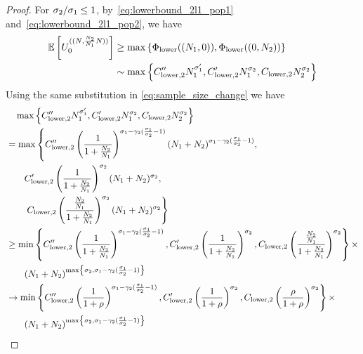 \begin{proof}
For $\sigma_{2}/\sigma_{1}\le 1$, by~\cref{eq:lowerbound_2l1_pop1} and~\cref{eq:lowerbound_2l1_pop2}, we have
\begin{align*}
    \E\left[\news{\bm{0}}{(\samplesize{},\frac{\samplesize{2}}{\samplesize{1}}\samplesize{})}\right]& \ge\max\left\{\lowerbound((\samplesize{1},0)),\lowerbound((0,\samplesize{2}))\right\} \\
    &\sim \max\left\{\constantlowerwithrateprime{2}\samplesize{1}^{\rate{1}'}, \constantlowerwithotherrate{2}\samplesize{1}^{\rate{2}}, \constantlower{2}\samplesize{2}^{\rate{2}}\right\} \\
\end{align*}
Using the same substitution in \cref{eq:sample_size_change} we have 
\begin{align*}
    &~~~\max\left\{C_{\mathrm{lower},2}''N_{1}^{\sigma_{1}'}, C_{\mathrm{lower},2}'N_{1}^{\sigma_{2}}, C_{\mathrm{lower},2}N_{2}^{\sigma_{2}}\right\}\\
    &=\max\left\{C_{\mathrm{lower},2}''\left(\frac{1}{1+\frac{N_{2}}{N_{1}}}\right)^{\sigma_{1}-\gamma_{2}(\frac{\sigma_{1}}{\sigma_{2}}-1)}(N_{1}+N_{2})^{\sigma_{1}-\gamma_{2}(\frac{\sigma_{1}}{\sigma_{2}}-1)}, \right.\\
    &~~~~~~C_{\mathrm{lower},2}'\left(\frac{1}{1+\frac{N_{2}}{N_{1}}}\right)^{\sigma_{2}}(N_{1}+N_{2})^{\sigma_{2}}, \\
    &~~~~~~\left.C_{\mathrm{lower},2}\left(\frac{\frac{N_{2}}{N_{1}}}{1+\frac{N_{2}}{N_{1}}}\right)^{\sigma_{2}}(N_{1}+N_{2})^{\sigma_{2}} \right\} \\
    &\ge \min\left\{C_{\mathrm{lower},2}''\left(\frac{1}{1+\frac{N_{2}}{N_{1}}}\right)^{\sigma_{1}-\gamma_{2}(\frac{\sigma_{1}}{\sigma_{2}}-1)},C_{\mathrm{lower},2}'\left(\frac{1}{1+\frac{N_{2}}{N_{1}}}\right)^{\sigma_{2}}, C_{\mathrm{lower},2}\left(\frac{\frac{N_{2}}{N_{1}}}{1+\frac{N_{2}}{N_{1}}}\right)^{\sigma_{2}}\right\} \times \\
    &~~~~~~(N_{1}+N_{2})^{\max\left\{\sigma_{2}, \sigma_{1}-\gamma_{2}(\frac{\sigma_{1}}{\sigma_{2}}-1) \right\}}\\
    &\to \min\left\{C_{\mathrm{lower},2}''\left(\frac{1}{1+\rho}\right)^{\sigma_{1}-\gamma_{2}(\frac{\sigma_{1}}{\sigma_{2}}-1)},C_{\mathrm{lower},2}'\left(\frac{1}{1+\rho}\right)^{\sigma_{2}}, C_{\mathrm{lower},2}\left(\frac{\rho}{1+\rho}\right)^{\sigma_{2}} \right\} \times \\
    &~~~~~~(N_{1}+N_{2})^{\max\left\{\sigma_{2}, \sigma_{1}-\gamma_{2}(\frac{\sigma_{1}}{\sigma_{2}}-1) \right\}}
\end{align*}


\end{proof}
